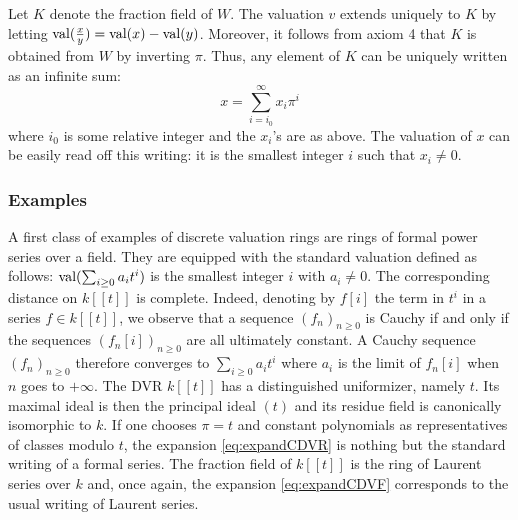 \documentclass{jT}
\numberwithin{equation}{section}
\DeclareMathOperator{\val}{val}
\theoremstyle{definition}
\renewcommand{\val}{\text{\rm val}}
\newcommand{\A}{W}
\begin{document}
Let $K$ denote the fraction field of $\A$. The valuation $v$ extends 
uniquely to $K$ by letting $\val(\frac x y) = \val(x) - \val(y)$. 
Moreover, it follows from axiom 4 that $K$ is obtained from $\A$ by 
inverting $\pi$. Thus, any element of $K$ can be uniquely written as an 
infinite sum:
\begin{equation}
\label{eq:expandCDVF}
x = \sum_{i=i_0}^\infty x_i \pi^i
\end{equation}
where $i_0$ is some relative integer and the $x_i$'s are as above. The 
valuation of $x$ can be easily read off this writing: it is the smallest 
integer $i$ such that $x_i \neq 0$.

\subsubsection{Examples}

A first class of examples of discrete valuation rings 
are rings of formal power series over a field. They are equipped with 
the standard valuation defined as follows: $\val(\sum_{i \geq 0} a_i 
t^i)$ is the smallest integer $i$ with $a_i \neq 0$. The corresponding 
distance on $k[[t]]$ is complete. Indeed, denoting by $f[i]$ the term in 
$t^i$ in a series $f \in k[[t]]$, we observe that a sequence $(f_n)_{n 
\geq 0}$ is Cauchy if and only if the sequences $(f_n[i])_{n \geq 0}$ 
are all ultimately constant. A Cauchy sequence $(f_n)_{n \geq 0}$ 
therefore converges to $\sum_{i \geq 0} a_i t^i$ where $a_i$ is the 
limit of $f_n[i]$ when $n$ goes to $+\infty$.
The DVR $k[[t]]$ has a distinguished uniformizer, namely $t$. Its 
maximal ideal is then the principal ideal $(t)$ and its residue field
is canonically isomorphic to $k$. 
If one chooses $\pi = t$ and constant polynomials as representatives of 
classes modulo $t$, the expansion \eqref{eq:expandCDVR} is nothing but 
the standard writing of a formal series.
The fraction field of $k[[t]]$ is the ring of Laurent series over $k$
and, once again, the expansion \eqref{eq:expandCDVF} corresponds to the
usual writing of Laurent series.

\medskip
\end{document}
